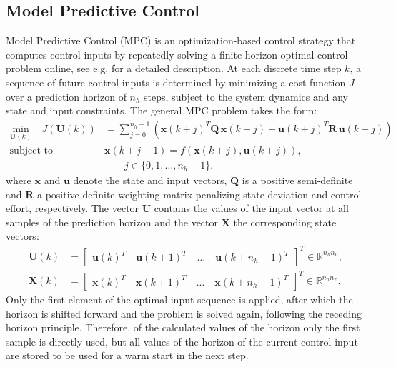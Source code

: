 \subsection{Model Predictive Control}
Model Predictive Control (MPC) is an optimization-based control strategy that computes control inputs by repeatedly solving a finite-horizon optimal control problem online, see e.g. \cite{rawlings2017model} for a detailed description. At each discrete time step $k$, a sequence of future control inputs is determined by minimizing a cost function $J$ over a prediction horizon of $n_h$ steps, subject to the system dynamics and any state and input constraints. The general MPC problem takes the form:
\begin{equation}\label{eqMPCGeneral}
    \begin{aligned}
        \underset{\bm{U}(k)}{\text{min}}\quad
        J(\bm{U}(k))
        &= \sum\limits_{j=0}^{n_h-1}
        \left(
        \bm{x}(k+j)^T \bm{Q}\,\bm{x}(k+j)
        + \bm{u}(k+j)^T \bm{R}\,\bm{u}(k+j)
        \right) \\
        \text{subject to}\quad
        &\bm{x}(k+j+1)
        = f(\bm{x}(k+j),\bm{u}(k+j)),\\
        &\qquad j \in \{0,1,\dots,n_h-1\}.
    \end{aligned}
\end{equation}
where $\bm{x}$ and $\bm{u}$ denote the state and input vectors, $\bm{Q}$ is a positive semi-definite and $\bm{R}$ a positive definite weighting matrix penalizing state deviation and control effort, respectively. The vector $\bm{U}$ contains the values of the input vector at all samples of the prediction horizon and the vector $\bm{X}$ the corresponding state vectors:
\begin{align*}
    \bm{U}(k) &= \begin{bmatrix} \bm{u}(k)^T \quad \bm{u}(k+1)^T \quad \ldots \quad  \bm{u}(k+n_h-1)^T \end{bmatrix}^T \in \mathbb{R}^{n_h n_u },\\
    \bm{X}(k) &= \begin{bmatrix} \bm{x}(k)^T \quad \bm{x}(k+1)^T \quad \ldots \quad  \bm{x}(k+n_h-1)^T \end{bmatrix}^T \in \mathbb{R}^{n_h n_x }.
\end{align*}
%
Only the first element of the optimal input sequence is applied, after which the horizon is shifted forward and the problem is solved again, following the receding horizon principle. Therefore, of the calculated values of the horizon only the first sample is directly used, but all values of the horizon of the current control input are stored to be used for a warm start in the next step.

